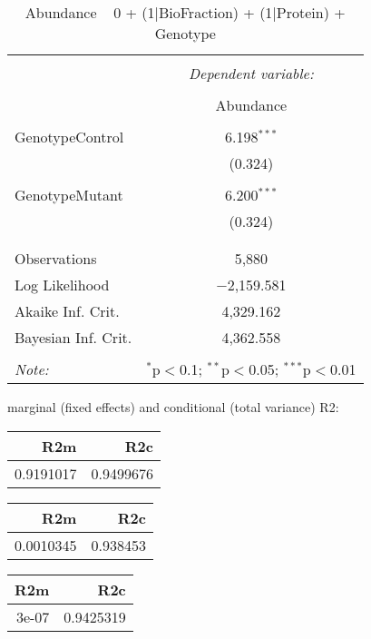 \documentclass[11pt]{report}
\begin{document}
\begin{table}[!htbp] \centering 
  \caption{Abundance ~ 0 + (1|BioFraction) + (1|Protein) + Genotype} 
  \label{} 
\begin{tabular}{@{\extracolsep{5pt}}lc} 
\\[-1.8ex]\hline 
\hline \\[-1.8ex] 
 & \multicolumn{1}{c}{\textit{Dependent variable:}} \\ 
\cline{2-2} 
\\[-1.8ex] & Abundance \\ 
\hline \\[-1.8ex] 
 GenotypeControl & 6.198$^{***}$ \\ 
  & (0.324) \\ 
  & \\ 
 GenotypeMutant & 6.200$^{***}$ \\ 
  & (0.324) \\ 
  & \\ 
\hline \\[-1.8ex] 
Observations & 5,880 \\ 
Log Likelihood & $-$2,159.581 \\ 
Akaike Inf. Crit. & 4,329.162 \\ 
Bayesian Inf. Crit. & 4,362.558 \\ 
\hline 
\hline \\[-1.8ex] 
\textit{Note:}  & \multicolumn{1}{r}{$^{*}$p$<$0.1; $^{**}$p$<$0.05; $^{***}$p$<$0.01} \\ 
\end{tabular} 
\end{table} 
marginal (fixed effects) and conditional (total variance) R2:

\begin{tabular}{r|r}
\hline
R2m & R2c\\
\hline
0.9191017 & 0.9499676\\
\hline
\end{tabular}

\begin{tabular}{r|r}
\hline
R2m & R2c\\
\hline
0.0010345 & 0.938453\\
\hline
\end{tabular}

\begin{tabular}{r|r}
\hline
R2m & R2c\\
\hline
3e-07 & 0.9425319\\
\hline
\end{tabular}
\end{document}
